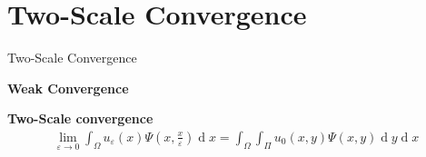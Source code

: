 \documentclass[nosymbols]{beamer}	%
\begin{document}
\section{Two-Scale Convergence}
\begin{frame}{Two-Scale Convergence}

\textbf{Weak Convergence}


\textbf{Two-Scale convergence}
\begin{align*}
\lim_{\varepsilon \to 0} \int_
{\Omega} u_\varepsilon (x) \Psi(x,\frac{x}{\varepsilon}) \operatorname d x = \int_{\Omega} \int_\Pi u_0(x,y) \Psi(x,y)\operatorname d y \operatorname d x
\end{align*}
\end{frame}


%
\end{document}
